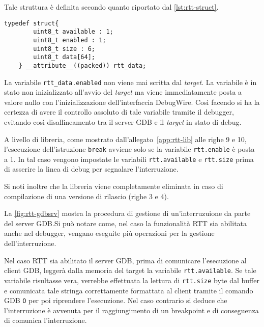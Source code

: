 Tale struttura è definita secondo quanto riportato dal \cref{lst:rtt-struct}.

\noindent\begin{minipage}{\textwidth}
    \begin{lstlisting}[style=C, caption={Struttura utilizzata per il salvataggio dei riferimenti ai breakpoint software}, label=lst:rtt-struct]
    typedef struct{
        uint8_t available : 1;
        uint8_t enabled : 1;
        uint8_t size : 6;
        uint8_t data[64];
    } __attribute__((packed)) rtt_data;
    \end{lstlisting}
\end{minipage}

La variabile \texttt{rtt\_data.enabled} non viene mai scritta dal \textit{target}. La variabile è in stato non inizializzato all'avvio del \textit{target} ma viene immediatamente posta a valore nullo con l'inizializzazione dell'interfaccia DebugWire. Così facendo si ha la certezza di avere il controllo assoluto di tale variabile tramite il debugger, evitando così disallineamento tra il server GDB e il \textit{target} in stato di debug.

A livello di libreria, come mostrato dall'allegato~\ref{app:rtt-lib} alle righe 9 e 10, l'esecuzione dell'istruzione \texttt{break} avviene solo se la variabile \texttt{rtt.enable} è posta a 1. In tal caso vengono impostate le variabili \texttt{rtt.available} e \texttt{rtt.size} prima di asserire la linea di debug per segnalare l'interruzione.

Si noti inoltre che la libreria viene completamente eliminata in caso di compilazione di una versione di rilascio (righe 3 e 4).

La \cref{fig:rtt-gdbsrv} mostra la procedura di gestione di un'interruzuione da parte del server GDB.\@ Si può notare come, nel caso la funzionalità RTT sia abilitata anche nel debugger, vengano eseguite più operazioni per la gestione dell'interruzione.

Nel caso RTT sia abilitato il server GDB, prima di comunicare l'esecuzione al client GDB, leggerà dalla memoria del target la variabile \texttt{rtt.available}. Se tale variabile risultasse vera, verrebbe effettuata la lettura di \texttt{rtt.size} byte dal buffer e comunicata tale stringa correttamente formattata al client tramite il comando GDB \texttt{O} per poi riprendere l'esecuzione. Nel caso contrario si deduce che l'interruzione è avvenuta per il raggiungimento di un breakpoint e di conseguenza di comunica l'interruzione.

